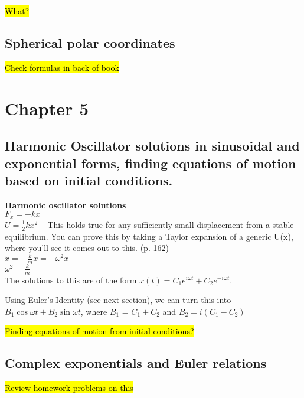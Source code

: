 \documentclass[a4paper, 11pt]{article}
\begin{document}
  \hl{What?}

  \subsection{Spherical polar coordinates}
  \hl{Check formulas in back of book}



  \section*{Chapter 5}

  \subsection{Harmonic Oscillator solutions in sinusoidal and exponential forms,
  finding equations of motion based on initial conditions.}

  \textbf{Harmonic oscillator solutions}\\
  $F_x = -k x$\\
  $U = \frac{1}{2}kx^2$  -- This holds true for any sufficiently small displacement
  from a stable equilibrium. You can prove this by taking a Taylor expansion
  of a generic U(x), where you'll see it comes out to this. (p. 162)\\

  $\ddot{x} = - \frac{k}{m}x = -\omega^2 x$\\
  $\omega^2 = \frac{k}{m}$\\

  The solutions to this are of the form $x(t) = C_1e^{i \omega t} + C_2e^{- i \omega t}$.

  Using Euler's Identity (see next section), we can turn this into
  $B_1 \cos{\omega t} + B_2 \sin{\omega t}$, where $B_1$ = $C_1 + C_2$ and
  $B_2 = i(C_1 - C_2) $

  \hl{Finding equations of motion from initial conditions?}


  \subsection{Complex exponentials and Euler relations}
  \hl{Review homework problems on this}\\
\end{document}
